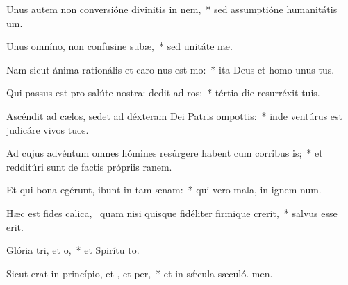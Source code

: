 \item Unus autem non conversióne divinitis in nem,~* sed assumptióne humanitátis  um.
\item Unus omníno, non confusine subæ,~* sed unitáte næ.
\item Nam sicut ánima rationális et caro nus est mo:~* ita Deus et homo unus  tus.
\item Qui passus est pro salúte nostra: dedit ad ros:~* tértia die resurréxit  tuis.
\item Ascéndit ad cælos, sedet ad déxteram Dei Patris ompottis:~* inde ventúrus est judicáre vivos  tuos.
\item Ad cujus advéntum omnes hómines resúrgere habent cum corribus is;~* et redditúri sunt de factis própriis ranem.
\item Et qui bona egérunt, ibunt in tam ænam:~* qui vero mala, in ignem num.
\item Hæc est fides calica,~\pscross{} quam nisi quisque fidéliter firmique crerit,~* salvus esse  erit.
\item Glória tri, et o,~* et Spirítu to.
\item Sicut erat in princípio, et , et per,~* et in sǽcula sæculó. men.
